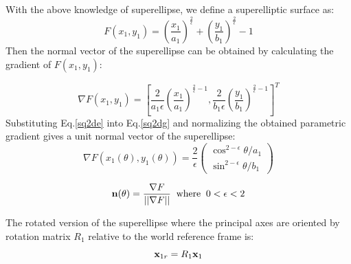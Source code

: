 \documentclass[]{article}
\begin{document}
With the above knowledge of superellipse, we define a superelliptic surface as:
\begin{equation}
F(x_1, y_1) = \left(\dfrac{x_1}{a_1} \right)^{\frac{2}{\epsilon}} + \left( \dfrac{y_1}{b_1}\right)^{\frac{2}{\epsilon}} - 1
\end{equation}
Then the normal vector of the superellipse can be obtained by calculating the gradient of $F(x_1, y_1)$:

\begin{equation}
\nabla F(x_1,y_1) =
\left[ \dfrac{2}{a_1 \epsilon}\left(\dfrac{x_1}{a_1} \right)^{\frac{2}{\epsilon } - 1}, \dfrac{2}{b_1\epsilon}\left(\dfrac{y_1}{b_1} \right)^{\frac{2}{\epsilon} - 1} \right]^{T}
\label{sq2dg}
\end{equation}
Substituting Eq.\eqref{sq2de} into Eq.\eqref{sq2dg} and normalizing the obtained parametric gradient gives a unit normal vector of the superellipse:
\begin{equation}
\nabla F(x_1(\theta), y_1(\theta)) = \dfrac{2}{\epsilon}
\left(
\begin{array}{c}
\cos^{2 - \epsilon}\theta /a_1 \\
\sin^{2 - \epsilon}\theta /b_1
\end{array}
\right)
\end{equation}

\begin{equation}
{\bf n}(\theta) =
\dfrac{\nabla F}{||\nabla F||} \; \; \text{where} \; \; 0 < \epsilon < 2
\end{equation}

%
The rotated version of the superellipse where the principal axes are oriented by rotation matrix $R_1$ relative to the world reference frame is:
\begin{equation}
{\bf x}_{1r}  = R_1 {\bf x}_1
\end{equation}
\end{document}
